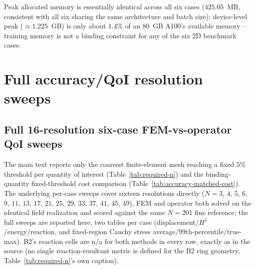 \documentclass[final,5p,times]{elsarticle}
\begin{document}
Peak allocated memory is essentially identical across all six cases
($425.05$~MB, consistent with all six sharing the same architecture and
batch size); device-level peak ($\approx1.225$~GB) is only about
$1.4\%$ of an 80~GB A100's available memory -- training memory is not a
binding constraint for any of the six 2D benchmark cases.

\FloatBarrier
\section{Full accuracy/QoI resolution sweeps}
\label{app:b}
\setcounter{table}{0}

\subsection{Full 16-resolution six-case FEM-vs-operator QoI sweeps}
The main text reports only the coarsest finite-element
mesh reaching a fixed $5\%$ threshold per quantity of interest
(Table~\ref{tab:required-n}) and the binding-quantity fixed-threshold
cost comparison (Table~\ref{tab:accuracy-matched-cost}). The underlying
per-case sweeps cover sixteen resolutions directly
($N{=}3$, $4$, $5$, $6$, $9$, $11$, $13$, $17$, $21$, $25$, $29$, $33$,
$37$, $41$, $45$, $49$), FEM and operator both solved on the identical
field realization and scored against the same $N{=}201$ fine reference;
the full sweeps are reported here, two tables per case
(displacement/$H^1$/energy/reaction, and fixed-region Cauchy stress
average/99th-percentile/true-max). B2's reaction cells are n/a for both
methods in every row, exactly as in the source (no single
reaction-resultant metric is defined for the B2 ring geometry,
Table~\ref{tab:required-n}'s own caption).
\end{document}
